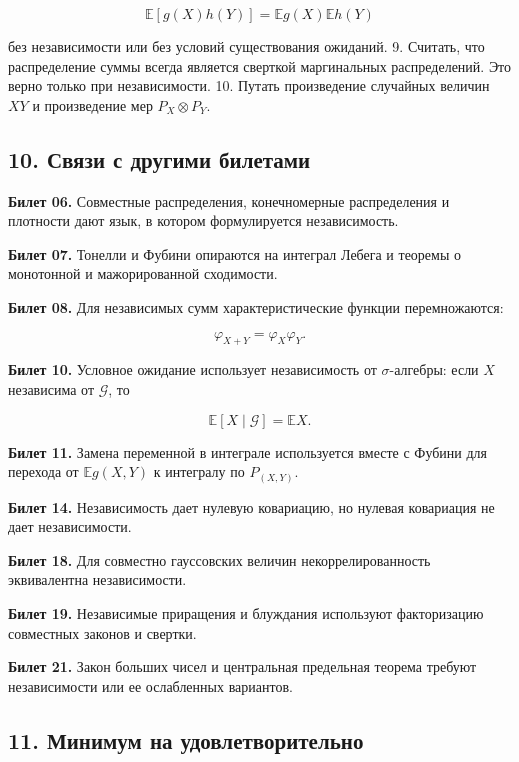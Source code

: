 \documentclass[
  11pt,
  a4paper,
]{article}
\begin{document}
\[
\mathbb E[g(X)h(Y)]=\mathbb E g(X)\mathbb E h(Y)
\]

без независимости или без условий существования ожиданий. 9. Считать,
что распределение суммы всегда является сверткой маргинальных
распределений. Это верно только при независимости. 10. Путать
произведение случайных величин \(XY\) и произведение мер
\(P_X\otimes P_Y\).

\subsection{10. Связи с другими
билетами}\label{ux441ux432ux44fux437ux438-ux441-ux434ux440ux443ux433ux438ux43cux438-ux431ux438ux43bux435ux442ux430ux43cux438}

\textbf{Билет 06.} Совместные распределения, конечномерные распределения
и плотности дают язык, в котором формулируется независимость.

\textbf{Билет 07.} Тонелли и Фубини опираются на интеграл Лебега и
теоремы о монотонной и мажорированной сходимости.

\textbf{Билет 08.} Для независимых сумм характеристические функции
перемножаются:

\[
\varphi_{X+Y}=\varphi_X\varphi_Y.
\]

\textbf{Билет 10.} Условное ожидание использует независимость от
\(\sigma\)-алгебры: если \(X\) независима от \(\mathcal G\), то

\[
\mathbb E[X\mid\mathcal G]=\mathbb EX.
\]

\textbf{Билет 11.} Замена переменной в интеграле используется вместе с
Фубини для перехода от \(\mathbb E g(X,Y)\) к интегралу по
\(P_{(X,Y)}\).

\textbf{Билет 14.} Независимость дает нулевую ковариацию, но нулевая
ковариация не дает независимости.

\textbf{Билет 18.} Для совместно гауссовских величин некоррелированность
эквивалентна независимости.

\textbf{Билет 19.} Независимые приращения и блуждания используют
факторизацию совместных законов и свертки.

\textbf{Билет 21.} Закон больших чисел и центральная предельная теорема
требуют независимости или ее ослабленных вариантов.

\subsection{11. Минимум на
удовлетворительно}\label{ux43cux438ux43dux438ux43cux443ux43c-ux43dux430-ux443ux434ux43eux432ux43bux435ux442ux432ux43eux440ux438ux442ux435ux43bux44cux43dux43e}
\end{document}
